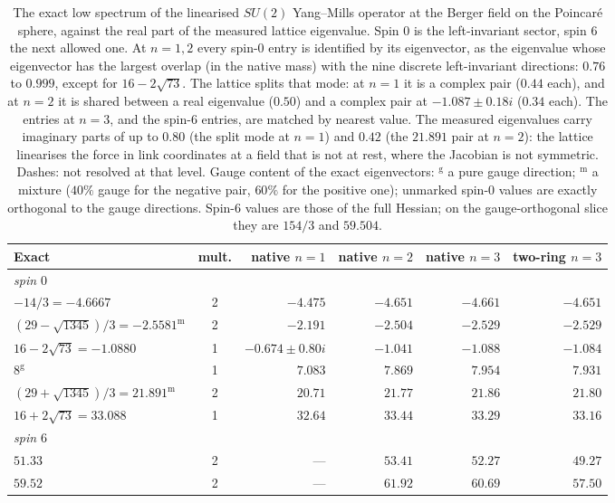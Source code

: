 \documentclass[11pt]{article}
\theoremstyle{definition}
\theoremstyle{remark}
\begin{document}
\begin{table}[t]\centering\small
\caption{The exact low spectrum of the linearised $SU(2)$ Yang--Mills operator at the Berger field
on the Poincar\'e sphere, against the real part of the measured lattice eigenvalue.
Spin $0$ is the left-invariant sector, spin $6$ the next allowed one. At $n=1,2$ every spin-$0$ entry
is identified by its eigenvector, as the eigenvalue whose eigenvector has the largest overlap
(in the native mass) with the nine discrete left-invariant directions: $0.76$ to $0.999$, except for
$16-2\sqrt{73}$. The lattice splits that mode: at $n=1$ it is a complex pair ($0.44$ each), and at
$n=2$ it is shared between a real eigenvalue ($0.50$) and a complex pair at $-1.087\pm0.18i$
($0.34$ each). The entries at $n=3$, and the spin-$6$ entries, are matched by nearest value. The
measured eigenvalues carry imaginary parts of up to $0.80$ (the split mode at $n=1$) and $0.42$ (the
$21.891$ pair at $n=2$): the lattice linearises the force in link coordinates at a field that is not
at rest, where the Jacobian is not symmetric. Dashes: not resolved at that level.
Gauge content of the exact eigenvectors: $^{\mathrm g}$ a pure gauge direction; $^{\mathrm m}$ a mixture
($40\%$ gauge for the negative pair, $60\%$ for the positive one); unmarked spin-$0$ values are exactly
orthogonal to the gauge directions. Spin-$6$ values are those of the full Hessian; on the
gauge-orthogonal slice they are $154/3$ and $59.504$.}
\label{tab:su2exact}
\begin{tabular}{lcrrrr}\toprule
Exact & mult. & native $n=1$ & native $n=2$ & native $n=3$ & two-ring $n=3$ \\ \midrule
\multicolumn{6}{l}{\emph{spin $0$}}\\
$-14/3=-4.6667$ & 2 & $-4.475$ & $-4.651$ & $-4.661$ & $-4.651$ \\
$(29-\sqrt{1345})/3=-2.5581^{\mathrm m}$ & 2 & $-2.191$ & $-2.504$ & $-2.529$ & $-2.529$ \\
$16-2\sqrt{73}=-1.0880$ & 1 & $-0.674\pm0.80i$ & $-1.041$ & $-1.088$ & $-1.084$ \\
$8^{\mathrm g}$ & 1 & $7.083$ & $7.869$ & $7.954$ & $7.931$ \\
$(29+\sqrt{1345})/3=21.891^{\mathrm m}$ & 2 & $20.71$ & $21.77$ & $21.86$ & $21.80$ \\
$16+2\sqrt{73}=33.088$ & 1 & $32.64$ & $33.44$ & $33.29$ & $33.16$ \\ \midrule
\multicolumn{6}{l}{\emph{spin $6$}}\\
$51.33$ & 2 & --- & $53.41$ & $52.27$ & $49.27$ \\
$59.52$ & 2 & --- & $61.92$ & $60.69$ & $57.50$ \\
\bottomrule\end{tabular}
\end{table}
\end{document}
